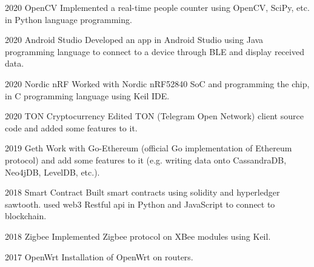 \documentclass{tccv}
\begin{document}
\begin{yearlist}
\item{2020}
{OpenCV}
	{Implemented a real-time people counter using OpenCV, SciPy, etc. in Python language programming.}

\item{2020}
	{Android Studio}
	{Developed an app in Android Studio using Java programming language to connect to a device through BLE and display received data.}

\item{2020}
	{Nordic nRF}
	{Worked with Nordic nRF52840 SoC and programming the chip, in C programming language using Keil IDE.}


\item{2020}
	{TON Cryptocurrency}
	{Edited TON (Telegram Open Network) client source code and added some features to it.}

\item{2019}
     {Geth}
     {Work with Go-Ethereum (official Go implementation of Ethereum protocol) and add some features to it (e.g. writing data onto CassandraDB, Neo4jDB, LevelDB, etc.).}


\item{2018}
     {Smart Contract}
     {Built smart contracts using solidity and hyperledger sawtooth. used web3 Restful api in Python and JavaScript to connect to blockchain.}

\item{2018}
     {Zigbee}
     {Implemented Zigbee protocol on XBee modules using Keil.}

\item{2017}
     {OpenWrt}
     {Installation of OpenWrt on routers.}
\end{yearlist}
\end{document}

